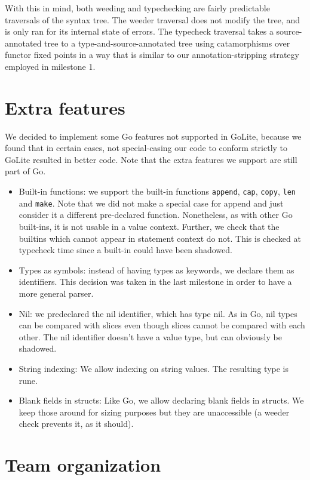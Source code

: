 \documentclass[letterpaper,11pt]{article}
\begin{document}
With this in mind, both weeding and typechecking are fairly predictable traversals of the syntax tree. The weeder traversal does not modify the tree, and is only ran for its internal state of errors. The typecheck traversal takes a source-annotated tree to a type-and-source-annotated tree using catamorphisms over functor fixed points in a way that is similar to our annotation-stripping strategy employed in milestone 1.


\section{Extra features}
We decided to implement some Go features not supported in GoLite, because we found that in certain cases, not special-casing our code to conform strictly to GoLite resulted in better code. Note that the extra features we support are still part of Go.
\begin{itemize}
\item Built-in functions: we support the built-in functions \texttt{append}, \texttt{cap}, \texttt{copy}, \texttt{len} and \texttt{make}. Note that we did not make a special case for append and just consider it a different pre-declared function. Nonetheless, as with other Go built-ins, it is not usable in a value context. Further, we check that the builtins which cannot appear in statement context do not. This is checked at typecheck time since a built-in could have been shadowed.
\item Types as symbols: instead of having types as keywords, we declare them as identifiers. This decision was taken in the last milestone in order to have a more general parser.
\item Nil: we predeclared the nil identifier, which has type nil. As in Go, nil types can be compared with slices even though slices cannot be compared with each other. The nil identifier doesn't have a value type, but can obviously be shadowed.
\item String indexing: We allow indexing on string values. The resulting type is rune.
\item Blank fields in structs: Like Go, we allow declaring blank fields in structs. We keep those around for sizing purposes but they are unaccessible (a weeder check prevents it, as it should).
\end{itemize}

\section{Team organization}
\end{document}
